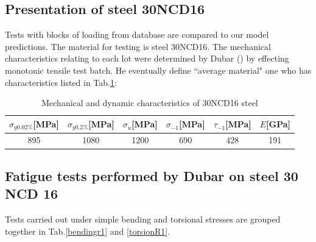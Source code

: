 \documentclass[3p,times,procedia,number]{elsarticle}
\begin{document}
\subsection{Presentation of steel 30NCD16}
Tests with blocks of loading from database are compared to our model predictions. The material for testing is steel 30NCD16. The mechanical characteristics relating to each lot were determined by Dubar (\cite{Dubar1992}) by effecting monotonic tensile test batch. He eventually define ``average material" one who has characteristics listed in Tab.\ref{30ncdchar}:

\begin{table}[!h]
	\centering
	\begin{tabular}{|c|c|c|c|l|c|}
		\hline
		\textbf{$\sigma_{y0.02\%}${[}MPa{]}} & \textbf{$\sigma_{y0.2\%}${[}MPa{]}} & \textbf{$\sigma_u${[}MPa{]}} & \textbf{$\sigma_{-1}${[}MPa{]}} & \textbf{$\tau_{-1}${[}MPa{]}} & \textbf{$E${[}GPa{]}}\\ \hline
		895                                  & 1080                                & 1200                         & 690                             & \multicolumn{1}{c|}{428}     & 191 \\ \hline
	\end{tabular}
	\caption{Mechanical and dynamic characteristics of 30NCD16 steel \cite{Dubar1992}}
	\label{30ncdchar}
\end{table}

\subsection{Fatigue tests performed by Dubar on steel 30 NCD 16}
Tests carried out under simple bending and torsional stresses are grouped together in
Tab.\ref{bendingr1} and \ref{torsionR1}.
\end{document}
